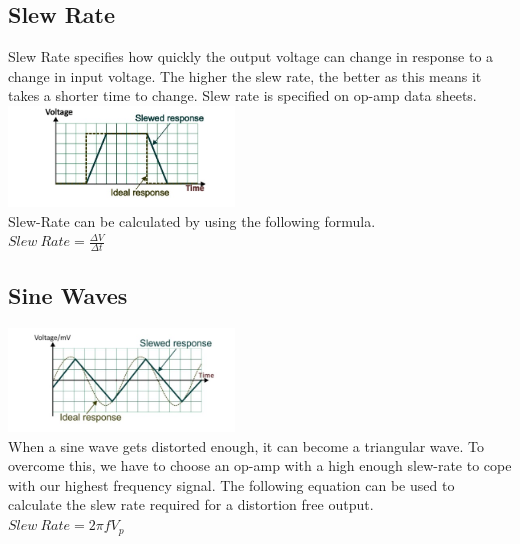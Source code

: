 \documentclass[a4paper,11pt, twocolumn]{article}
\begin{document}
\subsection{Slew Rate}
Slew Rate specifies how quickly the output voltage can change in response to a change in input voltage. The higher the slew rate, the better as this means it takes a shorter time to change. Slew rate is specified on op-amp data sheets.
\includegraphics[width=0.45\textwidth]{slewRate.jpg}\\
Slew-Rate can be calculated by using the following formula.\\
$\displaystyle Slew\ Rate = \frac{\Delta V}{\Delta t}$
\subsection{Sine Waves}
\includegraphics[width=0.45\textwidth]{slewRateSine.jpg}\\
When a sine wave gets distorted enough, it can become a triangular wave. To overcome this, we have to choose an op-amp with a high enough slew-rate to cope with our highest frequency signal. The following equation can be used to calculate the slew rate required for a distortion free output. \\
$\displaystyle Slew\ Rate = 2\pi f V_p$
\end{document}
